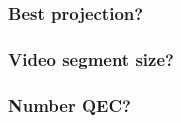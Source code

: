 \begin{frame}[c]
   \frametitle{Best projection?}

   \begin{independentCounter}
   \end{independentCounter}
\end{frame}

\begin{frame}[c]
   \frametitle{Video segment size?}

   \begin{independentCounter}
   \end{independentCounter}
\end{frame}

\begin{frame}[c]
   \frametitle{Number QEC?}

   \begin{independentCounter}
   \end{independentCounter}
\end{frame}
